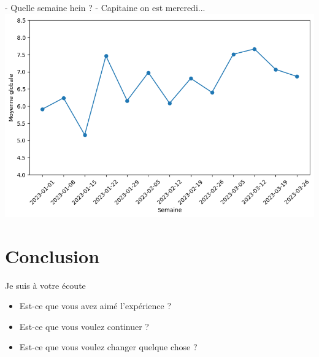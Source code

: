 \documentclass[svgnames]{beamer}
\begin{document}
\begin{frame}{- Quelle semaine hein ? - Capitaine on est mercredi...}
    \includegraphics[width=\textwidth]{data/semaines.png}
\end{frame}

\section{Conclusion}

\begin{frame}{Je suis à votre écoute}
    \begin{itemize}
    \item <1-> Est-ce que vous avez aimé l'expérience ?
    \item <2-> Est-ce que vous voulez continuer ?
    \item <3-> Est-ce que vous voulez changer quelque chose ?
\end{itemize}
\end{frame}
\end{document}
